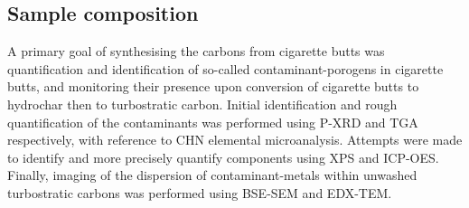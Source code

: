 \subsection{Sample composition}

A primary goal of synthesising the carbons from cigarette butts was quantification and identification of so-called contaminant-porogens in cigarette butts, and monitoring their presence upon conversion of cigarette butts to hydrochar then to turbostratic carbon. Initial identification and rough quantification of the contaminants was performed using P-XRD and TGA respectively, with reference to CHN elemental microanalysis. Attempts were made to identify and more precisely quantify components using XPS and ICP-OES. Finally, imaging of the dispersion of contaminant-metals within unwashed turbostratic carbons was performed using BSE-SEM and EDX-TEM.

